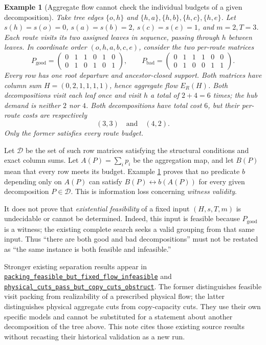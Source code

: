 \documentclass[11pt]{article}
\newtheorem{example}[proposition]{Example}
\theoremstyle{remark}
\newcommand{\code}[1]{\nolinkurl{#1}}
\newcommand{\src}[2]{\href{https://github.com/huam54925-cpu/uav-routing-certification/blob/1bc992475a9bd515d77245e2bc0471e5ecab2fd5/LeanCompletion/UAV/#1.lean}{#2}}
\begin{document}
\begin{example}[Aggregate flow cannot check the individual budgets of a given decomposition]\label{ex:aggregate}
Take tree edges $\{o,h\}$ and $\{h,a\},\{h,b\},\{h,c\},\{h,e\}$.
Let $s(h)=s(o)=0$, $s(a)=s(b)=2$, $s(c)=s(e)=1$, and $m=2,T=3$.
Each route visits its two assigned leaves in sequence, passing through $h$ between leaves.
In coordinate order $(o,h,a,b,c,e)$, consider the two per-route matrices
\[
 P_{\mathrm{good}}=
 \begin{pmatrix}0&1&1&0&1&0\\0&1&0&1&0&1\end{pmatrix},\qquad
 P_{\mathrm{bad}}=
 \begin{pmatrix}0&1&1&1&0&0\\0&1&0&0&1&1\end{pmatrix}.
\]
Every row has one root departure and ancestor-closed support. Both matrices have column sum
$H=(0,2,1,1,1,1)$, hence aggregate flow $E_R(H)$.
Both decompositions visit each leaf once and visit $h$ a total of $2+4=6$ times;
the hub demand is neither $2$ nor $4$.
Both decompositions have total cost $6$, but their per-route costs are respectively
\[
 (3,3)\quad\text{and}\quad(4,2).
\]
Only the former satisfies every route budget.
\end{example}

Let $\mathcal D$ be the set of such row matrices satisfying the structural conditions and exact column sums.
Let $A(P)=\sum_i p_i$ be the aggregation map, and let $B(P)$ mean that every row meets its budget.
Example \ref{ex:aggregate} proves that no predicate $b$ depending only on $A(P)$ can satisfy
$B(P)\leftrightarrow b(A(P))$ for every given decomposition $P\in\mathcal D$.
This is information loss concerning \emph{witness validity}.

It does not prove that \emph{existential feasibility} of a fixed input $(H,s,T,m)$ is undecidable or cannot be determined.
Indeed, this input is feasible because $P_{\mathrm{good}}$ is a witness;
the existing complete search seeks a valid grouping from that same input.
Thus ``there are both good and bad decompositions'' must not be restated as ``the same instance is both feasible and infeasible.''

Stronger existing separation results appear in
\src{FixedFlowObstruction}{\code{packing_feasible_but_fixed_flow_infeasible}}
and \src{CopyLiftObstruction}{\code{physical_cuts_pass_but_copy_cuts_obstruct}}.
The former distinguishes feasible visit packing from realizability of a prescribed physical flow; the latter distinguishes physical aggregate cuts from copy-capacity cuts.
They use their own specific models and cannot be substituted for a statement about another decomposition of the tree above.
This note cites those existing source results without recasting their historical validation as a new run.
\end{document}
